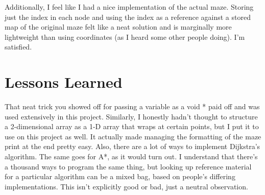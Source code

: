 \documentclass[11pt]{report}
\begin{document}
Additionally, I feel like I had a nice implementation of the actual maze. Storing just the index in each node and using the index as a reference against a stored map of the original maze felt like a neat solution and is marginally more lightweight than using coordinates (as I heard some other people doing). I'm satisfied.
\pagebreak
\section*{Lessons Learned}
That neat trick you showed off for passing a variable as a void * paid off and was used extensively in this project. Similarly, I honestly hadn't thought to structure a 2-dimensional array as a 1-D array that wraps at certain points, but I put it to use on this project as well. It actually made managing the formatting of the maze print at the end pretty easy. Also, there are a lot of ways to implement Dijkstra's algorithm. The same goes for A*, as it would turn out. I understand that there's a thousand ways to program the same thing, but looking up reference material for a particular algorithm can be a mixed bag, based on people's differing implementations. This isn't explicitly good or bad, just a neutral observation.
\end{document}
